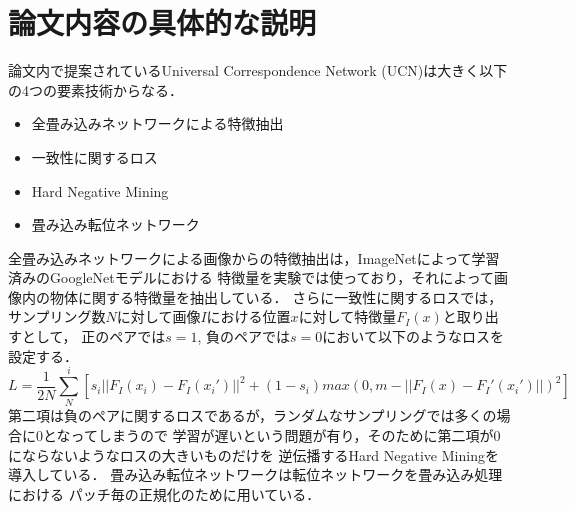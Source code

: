 \section{論文内容の具体的な説明}

論文内で提案されているUniversal Correspondence Network (UCN)は大きく以下の4つの要素技術からなる．
\begin{itemize}
  \item 全畳み込みネットワークによる特徴抽出
  \item 一致性に関するロス
  \item Hard Negative Mining
  \item 畳み込み転位ネットワーク
\end{itemize}
全畳み込みネットワークによる画像からの特徴抽出は，ImageNetによって学習済みのGoogleNetモデルにおける
特徴量を実験では使っており，それによって画像内の物体に関する特徴量を抽出している．
さらに一致性に関するロスでは，
サンプリング数$N$に対して画像$I$における位置$x$に対して特徴量$F_I(x)$と取り出すとして，
正のペアでは$s=1$, 負のペアでは$s=0$において以下のようなロスを設定する．
\begin{equation*}
  L = \frac{1}{2N} \sum_{N}^{i} \left[ s_i || F_I(x_i) - F_I(x_i') ||^2 + (1 - s_i) max(0, m - ||F_I(x) - F_I'(x_i')||)^2 \right]
\end{equation*}
第二項は負のペアに関するロスであるが，ランダムなサンプリングでは多くの場合に0となってしまうので
学習が遅いという問題が有り，そのために第二項が0にならないようなロスの大きいものだけを
逆伝播するHard Negative Miningを導入している．
畳み込み転位ネットワークは転位ネットワーク\cite{ST}を畳み込み処理における
パッチ毎の正規化のために用いている．
